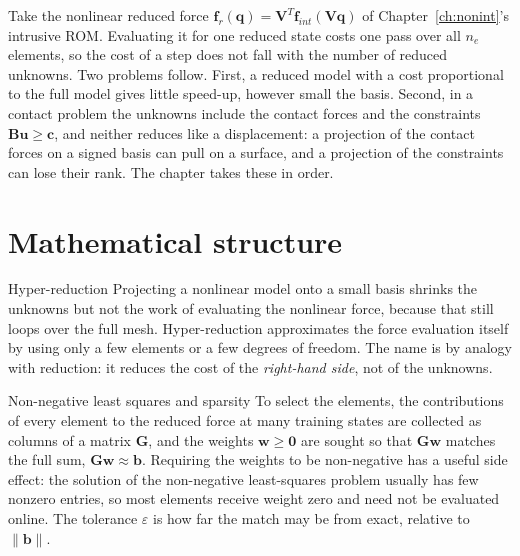 Take the nonlinear reduced force $\bm f_r(\bm q)=\bm V^T\bm f_{int}(\bm V\bm q)$ of Chapter~\ref{ch:nonint}'s intrusive ROM. Evaluating it for one reduced state costs one pass over all $n_e$ elements, so the cost of a step does not fall with the number of reduced unknowns. Two problems follow. First, a reduced model with a cost proportional to the full model gives little speed-up, however small the basis. Second, in a contact problem the unknowns include the contact forces and the constraints $\bm B\bm u\ge\bm c$, and neither reduces like a displacement: a projection of the contact forces on a signed basis can pull on a surface, and a projection of the constraints can lose their rank. The chapter takes these in order.

\section{Mathematical structure}\label{sec:hy-math}

\begin{sidenote}{Hyper-reduction}
Projecting a nonlinear model onto a small basis shrinks the unknowns but not the work of evaluating the nonlinear force, because that still loops over the full mesh. Hyper-reduction approximates the force evaluation itself by using only a few elements or a few degrees of freedom. The name is by analogy with reduction: it reduces the cost of the \emph{right-hand side}, not of the unknowns.
\end{sidenote}

\begin{sidenote}{Non-negative least squares and sparsity}
To select the elements, the contributions of every element to the reduced force at many training states are collected as columns of a matrix $\bm G$, and the weights $\bm w\ge\bm0$ are sought so that $\bm G\bm w$ matches the full sum, $\bm G\bm w\approx\bm b$. Requiring the weights to be non-negative has a useful side effect: the solution of the non-negative least-squares problem usually has few nonzero entries, so most elements receive weight zero and need not be evaluated online. The tolerance $\varepsilon$ is how far the match may be from exact, relative to $\|\bm b\|$.
\end{sidenote}

